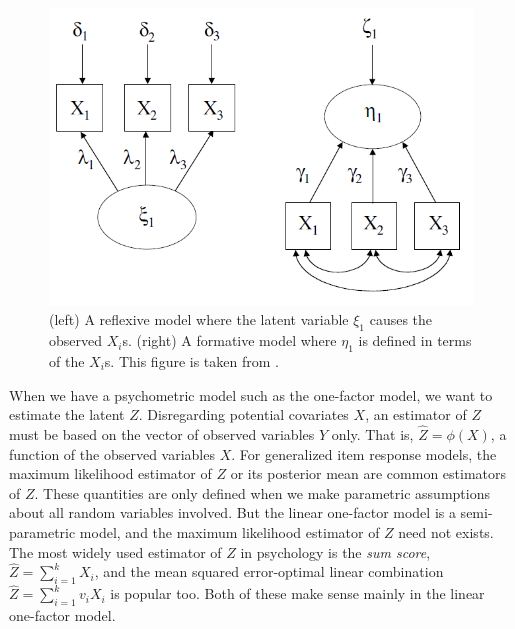 \begin{figure}
\noindent \begin{centering}
\includegraphics[scale=0.5]{chunks/borsboom}
\par\end{centering}

\caption{\label{fig:dag}(left) A reflexive model where the latent variable $\xi_{1}$ causes the observed $X_{i}$s. (right) A formative model where $\eta_{1}$ is defined in terms of the $X_{i}$s. This figure is taken from \cite[p. 61]{Borsboom2005-iq}.}
\end{figure}

When we have a psychometric model such as the one-factor model, we want to estimate the latent $Z$. Disregarding potential covariates $X$, an estimator of $Z$ must be based on the vector of observed variables $Y$ only. That is, $\hat{Z}=\phi(X)$, a function of the observed variables $X$. For generalized item response models, the maximum likelihood estimator of $Z$ or its posterior mean are common estimators of $Z$. These quantities are only defined when we make parametric assumptions about all random variables involved. But the linear one-factor model is a semi-parametric model, and the maximum likelihood estimator of $Z$ need not exists. The most widely used estimator of $Z$ in psychology is the \emph{sum
score}, $\hat{Z}=\sum_{i=1}^{k}X_{i}$, and the mean squared error-optimal linear combination $\hat{Z}=\sum_{i=1}^{k}v_{i}X_{i}$ is popular too. Both of these make sense mainly in the linear one-factor model. 

